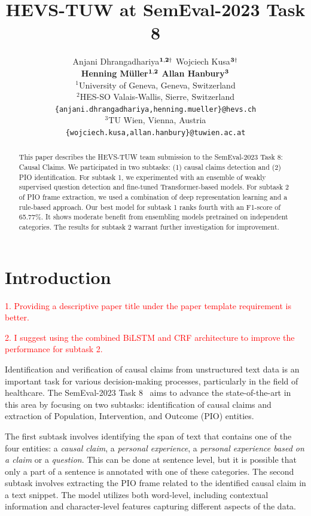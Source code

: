 \documentclass[11pt]{article}
\title{HEVS-TUW at SemEval-2023 Task 8}
\author{Anjani Dhrangadhariya\hspace{1pt}$^{{{\bf 1,2}}\dag}$ \hspace{.7cm} Wojciech Kusa\hspace{1pt}$^{{\bf 3}\dag}$ \\[0.15cm] {\bf Henning Müller\hspace{1pt}$^{{\bf 1,2}}$}  \hspace{.7cm}  {\bf Allan Hanbury\hspace{1pt}$^{{\bf 3}}$}
\\[0.4cm]
{$^1$University of Geneva, Geneva, Switzerland} \\
{$^2$HES-SO Valais-Wallis, Sierre, Switzerland} \\
{\tt \{anjani.dhrangadhariya,henning.mueller\}@hevs.ch} \\
{$^3$TU Wien, Vienna, Austria} \\
{\tt \{wojciech.kusa,allan.hanbury\}@tuwien.ac.at} \\
}
\begin{document}
\maketitle
{\let\thefootnote\relax{}}

\begin{abstract}
This paper describes the HEVS-TUW team submission to the SemEval-2023 Task 8: Causal Claims.
We participated in two subtasks: (1) causal claims detection and (2)  PIO identification.
For subtask 1, we experimented with an ensemble of weakly supervised question detection and fine-tuned Transformer-based models.
For subtask 2 of PIO frame extraction, we used a combination of deep representation learning and a rule-based approach. 
Our best model for subtask 1 ranks fourth with an F1-score of 65.77\%.
It shows moderate benefit from ensembling models pretrained on independent categories.
The results for subtask 2 warrant further investigation for improvement.
\end{abstract}

\section{Introduction}


\textcolor{red}{1.	Providing a descriptive paper title under the paper template requirement is better. }

\textcolor{red}{2.	I suggest using the combined BiLSTM and CRF architecture to improve the performance for subtask 2.}

% 
Identification and verification of causal claims from unstructured text data is an important task for various decision-making processes, particularly in the field of healthcare. The SemEval-2023 Task 8~\cite{CausalClaims} aims to advance the state-of-the-art in this area by focusing on two subtasks: identification of causal claims and extraction of Population, Intervention, and Outcome (PIO) entities.

% 
The first subtask involves identifying the span of text that contains one of the four entities: a \emph{causal claim}, a \emph{personal experience}, a \emph{personal experience based on a claim} or a \emph{question}. 
This can be done at sentence level, but it is possible that only a part of a sentence is annotated with one of these categories. 
The second subtask involves extracting the PIO frame related to the identified causal claim in a text snippet.
The model utilizes both word-level, including contextual information and character-level features capturing different aspects of the data.
\end{document}
